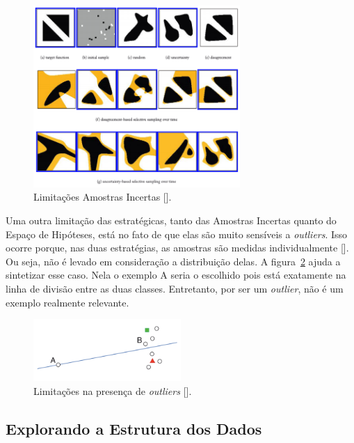 \begin{figure}
  \centering
  \includegraphics[width=0.7\textwidth]{figures/limitations_incertas.png}
  \caption{Limitações Amostras Incertas [\cite{settles2014active}].}
  \label{fig:limitations_incertas}
\end{figure}

Uma outra limitação das estratégicas, tanto das Amostras Incertas quanto do Espaço de Hipóteses, está no fato de que elas são muito sensíveis a \emph{outliers}. Isso ocorre porque, nas duas estratégias, as amostras são medidas individualmente [\cite{settles2014active}]. Ou seja, não é levado em consideração a distribuição delas. A figura~\ref{fig:limitations_outliers} ajuda a sintetizar esse caso. Nela o exemplo A seria o escolhido pois está exatamente na linha de divisão entre as duas classes. Entretanto, por ser um \emph{outlier}, não é um exemplo realmente relevante. 


\begin{figure}
  \centering
  \includegraphics[width=0.5\textwidth]{figures/limitations_outliers.png}
  \caption{Limitações na presença de \emph{outliers} [\cite{settles2014active}].}
  \label{fig:limitations_outliers}
\end{figure}


\subsection{Explorando a Estrutura dos Dados} 
\label{sec:explorando_estrutura_dados }

